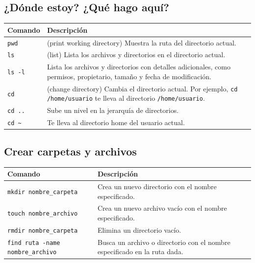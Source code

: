 \subsection{¿Dónde estoy? ¿Qué hago aquí?}

\begin{center}
\renewcommand{\arraystretch}{1.3}
\begin{tabular}{|p{3.5cm}|p{11.5cm}|}
\hline
\textbf{Comando} & \textbf{Descripción} \\ \hline
\lstinline!pwd! & (print working directory) Muestra la ruta del directorio actual. \\ \hline
\lstinline!ls! & (list) Lista los archivos y directorios en el directorio actual. \\ \hline
\lstinline!ls -l! & Lista los archivos y directorios con detalles adicionales, como permisos, propietario, tamaño y fecha de modificación. \\ \hline
\lstinline!cd! & (change directory) Cambia el directorio actual. Por ejemplo, \lstinline!cd /home/usuario! te lleva al directorio \lstinline!/home/usuario!. \\ \hline
\lstinline!cd ..! & Sube un nivel en la jerarquía de directorios. \\ \hline
\lstinline!cd ~! & Te lleva al directorio home del usuario actual. \\ \hline
\end{tabular}
\end{center}

\subsection{Crear carpetas y archivos}

\begin{center}
\renewcommand{\arraystretch}{1.3}
\begin{tabular}{|p{6cm}|p{9cm}|}
\hline
\textbf{Comando} & \textbf{Descripción} \\ \hline
\lstinline!mkdir nombre_carpeta! & Crea un nuevo directorio con el nombre especificado. \\ \hline
\lstinline!touch nombre_archivo! & Crea un nuevo archivo vacío con el nombre especificado. \\ \hline
\lstinline!rmdir nombre_carpeta! & Elimina un directorio vacío. \\ \hline
\lstinline!find ruta -name nombre_archivo! & Busca un archivo o directorio con el nombre especificado en la ruta dada. \\ \hline
\end{tabular}
\end{center}


